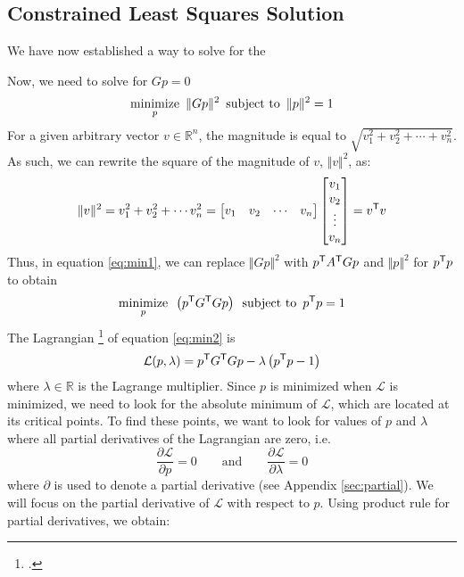 \subsection{Constrained Least Squares Solution}

We have now established a way to solve for the

Now, we need to solve for $Gp = 0$
\begin{equation} \label{eq:min1}
    \underset{p}{\text{minimize}}\enspace \lVert Gp \rVert^2 \enspace \text{subject to} \enspace \lVert p \rVert^2 = 1
\end{equation}
For a given arbitrary vector $v \in \mathbb{R}^n$, the magnitude is equal to $\sqrt{v_1^2+v_2^2+ \cdots + v_n^2}$. As such, we can rewrite the square of the magnitude of $v$, $\Vert v \Vert ^2$, as:
\begin{equation*}
    \Vert v \Vert^2
    = v_1^2+v_2^2+ \cdots v_n^2
    =
    \begin{bmatrix}
        v_1 & v_2 & \cdots & v_n
    \end{bmatrix}
    \begin{bmatrix}
        v_1 \\ v_2 \\ \vdots \\ v_n
    \end{bmatrix}
    = v^{\mathsf{T}} v
\end{equation*}
Thus, in equation \ref{eq:min1}, we can replace $\Vert Gp \Vert^2$ with $p^{\mathsf{T}} A^{\mathsf{T}} Gp$ and $\Vert p \Vert ^2$ for $p^{\mathsf{T}} p$ to obtain
\begin{equation} \label{eq:min2}
    \underset{p}{\text{minimize}}\enspace \left(p^{\mathsf{T}} G^{\mathsf{T}} Gp\right) \enspace \text{subject to} \enspace p^{\mathsf{T}} p = 1
\end{equation}
The Lagrangian \footcite[][2]{ghojoghEigenvalueGeneralized2023} of equation \ref{eq:min2} is
\begin{equation}
    \mathcal{L}(p, \lambda) = p^{\mathsf{T}} G^{\mathsf{T}} Gp - \lambda \left( p^{\mathsf{T}} p - 1 \right)
\end{equation}
where $\lambda \in \mathbb{R}$ is the Lagrange multiplier. Since $p$ is minimized when $\mathcal{L}$ is minimized, we need to look for the absolute minimum of $\mathcal{L}$, which are located at its critical points. To find these points, we want to look for values of $p$ and $\lambda$ where all partial derivatives of the Lagrangian are zero, i.e.
\begin{equation*}
    \frac{\partial \mathcal{L}}{\partial p} = 0 \qquad \text{and} \qquad \frac{\partial \mathcal{L}}{\partial \lambda} = 0
\end{equation*}
where $\partial$ is used to denote a partial derivative (see Appendix \ref{sec:partial}). We will focus on the partial derivative of $\mathcal{L}$ with respect to $p$. Using product rule for partial derivatives, we obtain:
